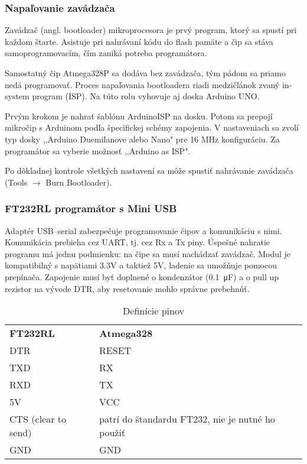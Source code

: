\documentclass[titlepage,12pt]{article}
\begin{document}
\subsubsection*{Napaľovanie zavádzača}
Zavádzač (angl. bootloader) mikroprocesora je prvý program, ktorý sa spustí pri každom štarte. Asistuje pri nahrávaní kódu do flash pamäte a čip sa stáva samoprogramovacím, čím zaniká potreba programátora.

Samostatný čip Atmega328P sa dodáva bez zavádzača, tým pádom sa priamo nedá programovať. Proces napaľovania bootloadera riadi medzičlánok zvaný in-system program (ISP). Na túto rolu vyhovuje aj doska Arduino UNO.

Prvým krokom je nahrať šablónu ArduinoISP na dosku. Potom sa prepojí mikročip s Arduinom podľa špecifickej schémy zapojenia. V nastaveniach sa zvolí typ dosky ,,Arduino Duemilanove alebo Nano" pre 16 MHz konfiguráciu. Za programátor sa vyberie možnosť ,,Arduino as ISP".

Po dôkladnej kontrole všetkých nastavení sa môže spustiť nahrávanie zavádzača (Tools $\rightarrow$ Burn Bootloader).


\newpage
\subsubsection*{FT232RL programátor s Mini USB}
Adaptér USB–serial zabezpečuje programovanie čipov a komunikáciu s nimi. Komunikácia prebieha cez UART, tj. cez Rx a Tx piny. Úspešné nahratie programu má jednu podmienku: na čipe sa musí nachádzať zavádzač. Modul je kompatibilný s napätiami 3.3V a taktiež 5V, ladenie sa umožňuje pomocou prepínača. Zapojenie musí byť doplnené o kondenzátor (\SI{0,1}{\micro\F}) a o pull up rezistor na vývode DTR, aby resetovanie mohlo správne prebehnúť.

\begin{table}[htb]
\begin{tabular}{ll}
\textbf{FT232RL}  	& \textbf{Atmega328}   \\
DTR          		& RESET                \\
TXD			 		& RX                   \\
RXD					& TX				   \\
5V					& VCC				   \\
CTS (clear to send) & patrí do štandardu FT232, nie je nutné ho použiť \\
GND					& GND
\end{tabular}
\caption{Definície pinov}
\end{table}
\end{document}
